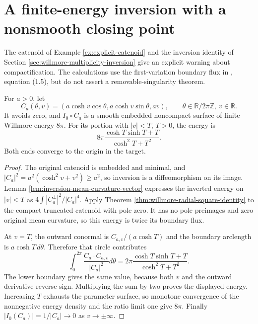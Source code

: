 \chapter{A finite-energy inversion with a nonsmooth closing point}\label{sec:examples-inverted-catenoid}
The catenoid of Example \ref{ex:explicit-catenoid} and the inversion identity of Section \ref{sec:willmore-multiplicity-inversion} give an explicit warning about compactification. The calculations use the first-variation boundary flux in \cite{SimW93}, equation (1.5), but do not assert a removable-singularity theorem.

\begin{proposition}\label{prop:inverted-catenoid-energy}
For $a>0$, let
\[
 C_a(\theta,v)=(a\cosh v\cos\theta,a\cosh v\sin\theta,av),
 \qquad \theta\in\mathbb R/2\pi\mathbb Z,\ v\in\mathbb R.
\]
It avoids zero, and $I_0\circ C_a$ is a smooth embedded noncompact surface of finite Willmore energy $8\pi$. For its portion with $|v|<T$, $T>0$, the energy is
\[
 8\pi\frac{\cosh T\sinh T+T}{\cosh^2T+T^2}.
\]
Both ends converge to the origin in the target.
\end{proposition}
\begin{proof}
The original catenoid is embedded and minimal, and $|C_a|^2=a^2(\cosh^2v+v^2)\geq a^2$, so inversion is a diffeomorphism on its image. Lemma \ref{lem:inversion-mean-curvature-vector} expresses the inverted energy on $|v|<T$ as $4\int |C_a^\perp|^2/|C_a|^4$. Apply Theorem \ref{thm:willmore-radial-square-identity} to the compact truncated catenoid with pole zero. It has no pole preimages and zero original mean curvature, so this energy is twice its boundary flux.

At $v=T$, the outward conormal is $C_{a,v}/(a\cosh T)$ and the boundary arclength is $a\cosh T\,d\theta$. Therefore that circle contributes
\[
 \int_0^{2\pi}\frac{C_a\cdot C_{a,v}}{|C_a|^2}d\theta
 =2\pi\frac{\cosh T\sinh T+T}{\cosh^2T+T^2}.
\]
The lower boundary gives the same value, because both $v$ and the outward derivative reverse sign. Multiplying the sum by two proves the displayed energy. Increasing $T$ exhausts the parameter surface, so monotone convergence of the nonnegative energy density and the ratio limit one give $8\pi$. Finally $|I_0(C_a)|=1/|C_a|\to0$ as $v\to\pm\infty$.
\end{proof}

